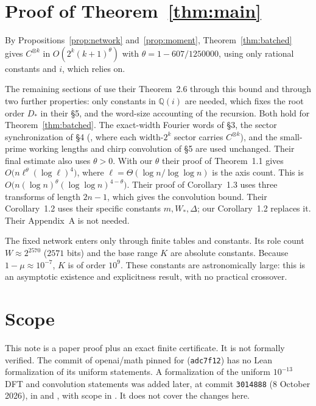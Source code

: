 \documentclass[11pt]{article}
\theoremstyle{definition}
\begin{document}
\section{Proof of Theorem~\ref{thm:main}}\label{sec:proof}
By Propositions~\ref{prop:network} and~\ref{prop:moment},
Theorem~\ref{thm:batched} gives $C^{\otimes k}$ in $O(2^k(k+1)^\theta)$ with
$\theta=1-607/1250000$, using only rational constants and $i$, which \cite[\S5.3]{oai-dft} relies on.

The remaining sections of \cite{oai-dft} use their Theorem~2.6 through this
bound and through two further properties: only constants in $\mathbb Q(i)$ are
needed, which fixes the root order $D_*$ in their \S5, and the word-size
accounting of the recursion. Both hold for Theorem~\ref{thm:batched}. The
exact-width Fourier words of \S3, the sector synchronization of \S4
(\cite[Proposition~4.2]{oai-dft}, where each width-$2^k$ sector carries
$C^{\otimes k}$), and
the small-prime working lengths and chirp convolution of \S5 are used
unchanged. Their final estimate also uses $\theta>0$. With our $\theta$ their
proof of Theorem~1.1 gives $O\bigl(n\ell^\theta(\log\ell)^4\bigr)$, where
$\ell=\Theta(\log n/\log\log n)$ is the axis count. This is
$O\bigl(n(\log n)^\theta(\log\log n)^{4-\theta}\bigr)$. Their proof of
Corollary~1.3 uses three transforms of length $2n-1$, which gives the
convolution bound. Their Corollary~1.2 uses their specific constants
$m,W_*,\Delta$; our Corollary~1.2 replaces it. Their Appendix~A is not needed.

The fixed network enters only through finite tables and constants. Its role
count $W\approx2^{2570}$ ($2571$ bits) and the base range $K$ are absolute
constants. Because $1-\mu\approx10^{-7}$, $K$ is of order $10^9$. These
constants are astronomically large: this is an asymptotic existence and
explicitness result, with no practical crossover.

\section{Scope}\label{sec:scope}
This note is a paper proof plus an exact finite certificate. It is not formally
verified. The commit of openai/math pinned for \cite{oai-dft}
(\texttt{adc7f12}) has no Lean formalization of its uniform statements. A
formalization of the uniform $10^{-13}$ DFT and convolution statements was
added later, at commit \texttt{3014888} (8 October 2026), in
 and
, with scope in
. It does not cover the changes here.
\end{document}
